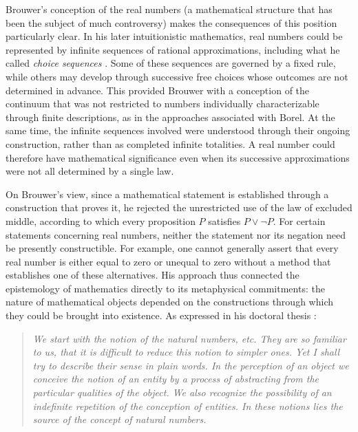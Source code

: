 \documentclass{article}
\begin{document}
Brouwer's conception of the real numbers (a mathematical structure that has been the subject of much controversy)
 makes the consequences of this position particularly clear. In his later intuitionistic mathematics, real numbers
 could be represented by infinite sequences of rational approximations, including what he called \textit{choice sequences} \textit{\parencite{brouwer1918}}. 
Some of these sequences are governed by a fixed rule, while others may develop through successive free choices whose 
outcomes are not determined in advance. This provided Brouwer with a conception of the continuum that was not restricted 
to numbers individually characterizable through finite descriptions, as in the approaches associated with Borel. At 
the same time, the infinite sequences involved were understood through their ongoing construction, rather than as 
completed infinite totalities. A real number could therefore have mathematical significance even when its successive 
approximations were not all determined by a single law.

On Brouwer's view, since a mathematical statement is established through a 
construction that proves it, he rejected the unrestricted use of the law of excluded middle, according to which 
every proposition \(P\) satisfies \(P\lor\neg P\). For certain statements concerning real numbers, neither the statement 
nor its negation need be presently constructible. For example, one cannot generally assert that every real number is 
either equal to zero or unequal to zero without a method that establishes one of these alternatives. His approach 
thus connected the epistemology of mathematics directly to its metaphysical commitments: the nature of 
mathematical objects depended on the constructions through which they could be brought into existence.
As expressed in his doctoral thesis \textit{\parencite{brouwer1907,brouwer1975}}:

\begin{quote}
\textit{We start with the notion of the natural numbers, etc. They are so familiar to us, that it is difficult to reduce 
this notion to simpler ones. Yet I shall try to describe their sense in plain words. In the perception of an object we 
conceive the notion of an entity by a process of abstracting from the particular qualities of the object. We also 
recognize the possibility of an indefinite repetition of the conception of entities. In these notions lies the source 
of the concept of natural numbers.}
\end{quote}
\end{document}
